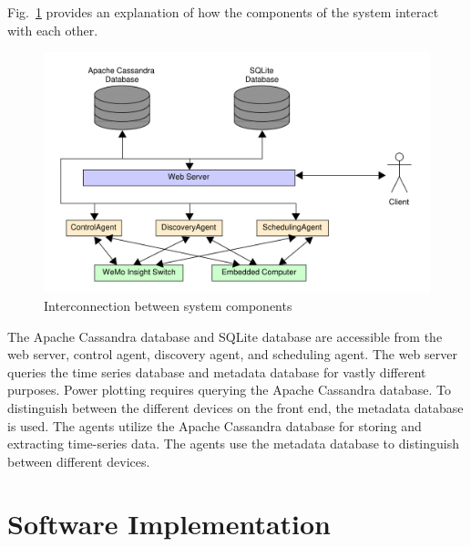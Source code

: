 \documentclass[conference]{IEEEtran}
\begin{document}
Fig.~\ref{fig:systemComponentInterconnection} provides an explanation of how
the components of the system interact with each other. %
%
\begin{figure}
  \centering
  \includegraphics[scale=0.15]{figs/overallDiagram.pdf}
  \caption{Interconnection between system components}
  \label{fig:systemComponentInterconnection}
\end{figure}
%
The Apache Cassandra database and SQLite database are accessible from the web server, control agent, discovery agent, and scheduling agent. The web server queries the time series database and metadata database for vastly different purposes. Power plotting requires querying the Apache Cassandra database. To distinguish between the different devices on the front end, the metadata database is used. The agents utilize the Apache Cassandra database for storing and extracting time-series data. The agents use the metadata database to distinguish between different devices. 

\section{Software Implementation}
\label{sec:SoftwareImplementation}
\end{document}
